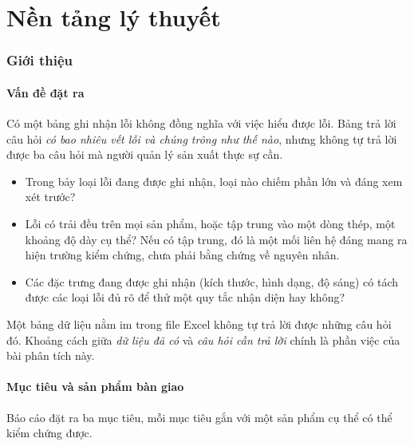 \documentclass[12pt]{article}
\begin{document}
\part{Nền tảng lý thuyết}

\section{Giới thiệu}

\subsection{Vấn đề đặt ra}

Có một bảng ghi nhận lỗi không đồng nghĩa với việc hiểu được lỗi. Bảng trả lời câu hỏi \emph{có bao nhiêu vết lỗi và chúng trông như thế nào}, nhưng không tự trả lời được ba câu hỏi mà người quản lý sản xuất thực sự cần.

\begin{itemize}
  \item Trong bảy loại lỗi đang được ghi nhận, loại nào chiếm phần lớn và đáng xem xét trước?
  \item Lỗi có trải đều trên mọi sản phẩm, hoặc tập trung vào một dòng thép, một khoảng độ dày cụ thể? Nếu có tập trung, đó là một mối liên hệ đáng mang ra hiện trường kiểm chứng, chưa phải bằng chứng về nguyên nhân.
  \item Các đặc trưng đang được ghi nhận (kích thước, hình dạng, độ sáng) có tách được các loại lỗi đủ rõ để thử một quy tắc nhận diện hay không?
\end{itemize}

\noindent Một bảng dữ liệu nằm im trong file Excel không tự trả lời được những câu hỏi đó. Khoảng cách giữa \emph{dữ liệu đã có} và \emph{câu hỏi cần trả lời} chính là phần việc của bài phân tích này.

\subsection{Mục tiêu và sản phẩm bàn giao}

Báo cáo đặt ra ba mục tiêu, mỗi mục tiêu gắn với một sản phẩm cụ thể có thể kiểm chứng được.
\end{document}
